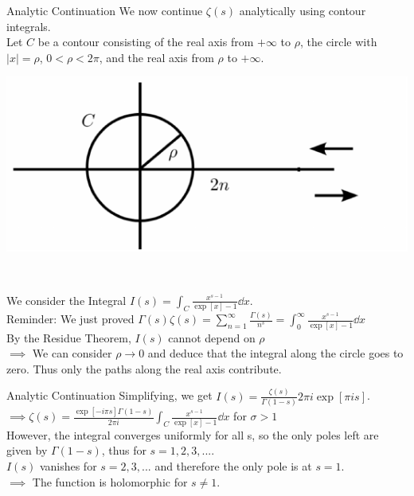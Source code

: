 \documentclass[10pt, dvipsnames]{beamer}
\begin{document}
	\begin{frame}{Analytic Continuation}
		We now continue $\zeta(s)$ analytically using contour integrals. \\
		Let $C$ be a contour consisting of the real axis from $+\infty$ to $\rho$, the circle with $|x|=\rho$, $0<\rho<2\pi$, and the real axis from $\rho$ to $+\infty$. \\
		\begin{center}
		\vspace{0.1cm}
		\begin{minipage}{0.45\textwidth}
			\includegraphics[scale=0.5]{int1}
		\end{minipage}\\[0.2cm]
		\end{center}
		We consider the Integral $I(s)=\int_C \frac{x^{s-1}}{\exp[x]-1} \dd{x}$. \\
		Reminder: We just proved $\Gamma(s)\zeta(s)=\sum_{n=1}^{\infty}\frac{\Gamma(s)}{n^s}=\int_{0}^{\infty}\frac{x^{s-1}}{\exp[x]-1} \dd{x}$ \\[1em]
		By the Residue Theorem, $I(s)$ cannot depend on $\rho$\\
		$\implies $ We can consider $\rho\rightarrow 0$ and deduce that the integral along the circle goes to zero. Thus only the paths along the real axis contribute. 
	\end{frame}
	
	\begin{frame}[t]{Analytic Continuation}
		Simplifying, we get $I(s)=\frac{\zeta(s)}{\Gamma(1-s)} 2\pi i\exp[\pi i s]$.\\
		$\implies \zeta(s)=\frac{\exp[-i\pi s]\Gamma(1-s)}{2\pi i} \int_C\frac{x^{s-1}}{\exp[x]-1} \dd{x}$ for $\sigma >1$ \\[1em]
		However, the integral converges uniformly for all s, so the only poles left are given by $\Gamma(1-s)$, thus for $s=1,2,3,...$. \\[1em]
		$I(s)$ vanishes for $s=2,3,...$ and therefore the only pole is at $s=1$. \\
		$\implies$ The function is holomorphic for $s\neq 1$. 
	\end{frame}
	
\end{document}
